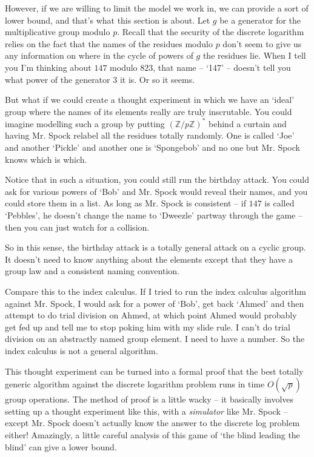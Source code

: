 \documentclass{article}
\theoremstyle{plain}
\theoremstyle{definition}
\theoremstyle{remark}
\numberwithin{theorem}{section}
\newcommand{\ZZ}{\mathbb{Z}}
\begin{document}
However, if we are willing to limit the model we work in, we can provide a sort of lower bound, and that's what this section is about.  Let $g$ be a generator for the multiplicative group modulo $p$.  Recall that the security of the discrete logarithm relies on the fact that the names of the residues modulo $p$ don't seem to give us any information on where in the cycle of powers of $g$ the residues lie.  When I tell you I'm thinking about $147$ modulo $823$, that name -- `147' -- doesn't tell you what power of the generator $3$ it is.  Or so it seems.

But what if we could create a thought experiment in which we have an `ideal' group where the names of its elements really are truly inscrutable.  You could imagine modelling such a group by putting $(\ZZ/p\ZZ)^*$ behind a curtain and having Mr. Spock relabel all the residues totally randomly.  One is called `Joe' and another `Pickle' and another one is `Spongebob' and no one but Mr. Spock knows which is which.

Notice that in such a situation, you could still run the birthday attack.  You could ask for various powers of `Bob' and Mr. Spock would reveal their names, and you could store them in a list.  As long as Mr. Spock is consistent -- if $147$ is called `Pebbles', he doesn't change the name to `Dweezle' partway through the game -- then you can just watch for a collision.

So in this sense, the birthday attack is a totally general attack on a cyclic group.  It doesn't need to know anything about the elements except that they have a group law and a consistent naming convention.

Compare this to the index calculus.  If I tried to run the index calculus algorithm against Mr. Spock, I would ask for a power of `Bob', get back `Ahmed' and then attempt to do trial division on Ahmed, at which point Ahmed would probably get fed up and tell me to stop poking him with my slide rule.  I can't do trial division on an abstractly named group element.  I need to have a number.  So the index calculus is not a general algorithm.

This thought experiment can be turned into a formal proof that the best totally generic algorithm against the discrete logarithm problem runs in time $O(\sqrt{p})$ group operations.  The method of proof is a little wacky -- it basically involves setting up a thought experiment like this, with a \emph{simulator} like Mr. Spock -- except Mr. Spock doesn't actually know the answer to the discrete log problem either!  Amazingly, a little careful analysis of this game of  `the blind leading the blind' can give a lower bound.
\end{document}
